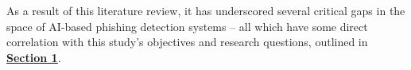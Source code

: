 
As a result of this literature review, it has underscored several critical gaps in the space of AI-based phishing detection systems -- all which have some direct correlation with this study's objectives and research questions, outlined in \hyperref[sec:1-introduction]{\uline{\textbf{Section 1}}}.
